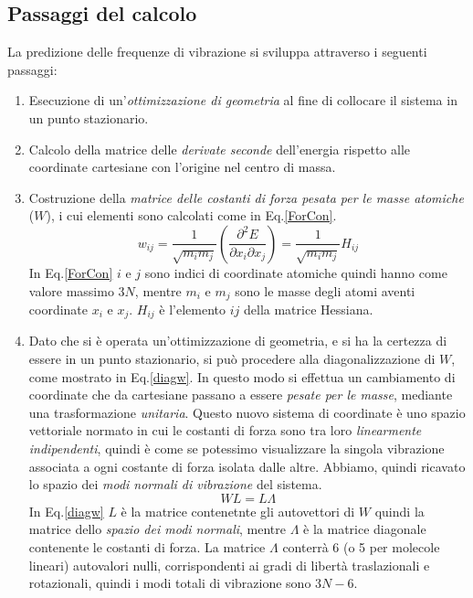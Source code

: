 \documentclass[oneside]{amsbook}
\numberwithin{section}{chapter}
\numberwithin{equation}{section}
\numberwithin{figure}{section}
\begin{document}
\subsection{Passaggi del calcolo}
La  predizione delle frequenze di vibrazione si sviluppa attraverso i seguenti passaggi:
\begin{enumerate}
\item Esecuzione di un'\emph{ottimizzazione di geometria} al fine di collocare il sistema in un punto stazionario.
\item Calcolo della matrice delle \emph{derivate seconde} dell'energia rispetto alle coordinate cartesiane con l'origine nel centro di massa.
\item Costruzione della \emph{matrice delle costanti di forza pesata per le masse atomiche} ($W$), i cui elementi sono calcolati come in Eq.\ref{ForCon}.
\begin{equation}
\label{ForCon}
w_{ij} = \frac{1}{ \sqrt{m_i m_j} } \left( \frac{ \partial ^2E}{ \partial x_i \partial x_j} \right)= \frac{1}{\sqrt{m_i m_j}} H_{ij}
\end{equation}
In Eq.\ref{ForCon} $i$ e $j$ sono indici di coordinate atomiche quindi hanno come valore massimo $3N$, mentre $m_i$ e $m_j$ sono le masse degli atomi aventi coordinate $x_i$ e $x_j$. $H_{ij}$ è l'elemento $ij$ della matrice Hessiana.
\item Dato che si è operata un'ottimizzazione di geometria, e si ha la certezza di essere in un punto stazionario, si può procedere alla diagonalizzazione di $W$, come mostrato in Eq.\ref{diagw}. In questo modo si effettua un cambiamento di coordinate che da cartesiane passano a essere \emph{pesate per le masse}, mediante una trasformazione \emph{unitaria}. Questo nuovo sistema di coordinate è uno spazio vettoriale normato in cui le costanti di forza sono tra loro \emph{linearmente indipendenti}, quindi è come se potessimo visualizzare la singola vibrazione associata a ogni costante di forza isolata dalle altre. Abbiamo, quindi ricavato lo spazio dei \emph{modi normali di vibrazione} del sistema.
\begin{equation}
\label{diagw}
WL= L \Lambda
\end{equation} 
In Eq.\ref{diagw} $L$ è la matrice contenetnte gli autovettori di $W$ quindi la matrice dello \emph{spazio dei modi normali}, mentre $\Lambda$ è la matrice diagonale contenente le costanti di forza. La matrice $\Lambda$ conterrà 6 (o 5 per molecole lineari) autovalori nulli, corrispondenti ai gradi di libertà traslazionali e rotazionali, quindi i modi totali di vibrazione sono $3N-6$.

\end{enumerate}
\end{document}
